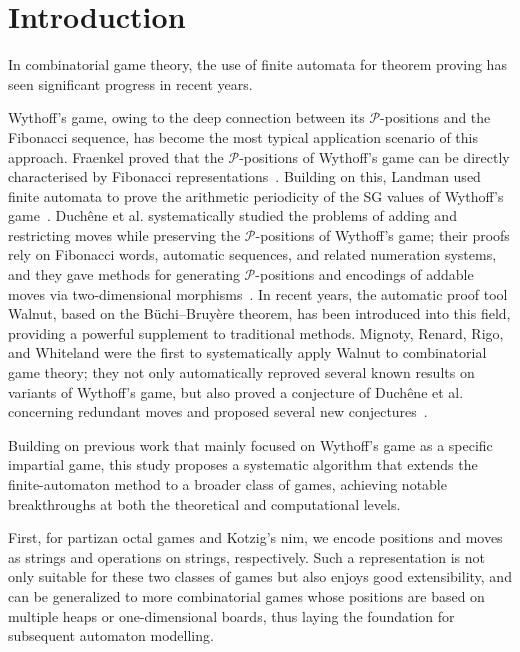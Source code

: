 \documentclass[11pt]{article}
\theoremstyle{definition}
\theoremstyle{plain}
\newcommand{\varP}{\mathcal{P}}
\begin{document}
\section{Introduction}

In combinatorial game theory, the use of finite automata for theorem proving has seen significant progress in recent years.

Wythoff's game, owing to the deep connection between its $\varP$-positions and the Fibonacci sequence, has become the most typical application scenario of this approach.
Fraenkel proved that the $\varP$-positions of Wythoff's game can be directly characterised by Fibonacci representations~\cite{1982Wyth}.
Building on this, Landman used finite automata to prove the arithmetic periodicity of the SG values of Wythoff's game~\cite{2002Wyth}.
Duch\^ene et al. systematically studied the problems of adding and restricting moves while preserving the $\varP$-positions of Wythoff's game; their proofs rely on Fibonacci words, automatic sequences, and related numeration systems,
and they gave methods for generating $\varP$-positions and encodings of addable moves via two-dimensional morphisms~\cite{2010Wyth}.
In recent years, the automatic proof tool Walnut, based on the B\"uchi--Bruyère theorem, has been introduced into this field, providing a powerful supplement to traditional methods.
Mignoty, Renard, Rigo, and Whiteland were the first to systematically apply Walnut to combinatorial game theory; they not only automatically reproved several known results on variants of Wythoff's game,
but also proved a conjecture of Duch\^ene et al. concerning redundant moves and proposed several new conjectures~\cite{2025Auto,2025Wyth}.

Building on previous work that mainly focused on Wythoff's game as a specific impartial game,
this study proposes a systematic algorithm that extends the finite-automaton method to a broader class of games, achieving notable breakthroughs at both the theoretical and computational levels.

First, for partizan octal games and Kotzig's nim, we encode positions and moves as strings and operations on strings, respectively.
Such a representation is not only suitable for these two classes of games but also enjoys good extensibility, and can be generalized to more combinatorial games whose positions are based on multiple heaps or one-dimensional boards, thus laying the foundation for subsequent automaton modelling.
\end{document}
